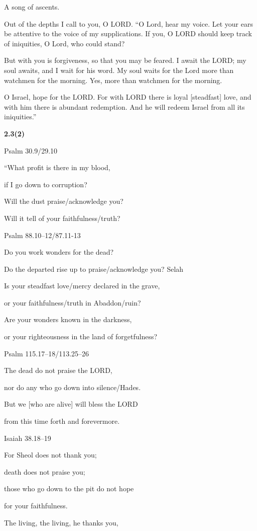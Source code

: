 \documentclass[
]{article}
\newcommand{\RL}[1]{\beginR #1\endR}
\begin{document}
A song of ascents.

Out of the depths I call to you, O LORD. \RL{``}O Lord, hear my voice.
Let your ears be attentive to the voice of my supplications. If you, O
LORD should keep track of iniquities, O Lord, who could stand?

But with you is forgiveness, so that you may be feared. I await the
LORD; my soul awaits, and I wait for his word. My soul waits for the
Lord more than watchmen for the morning. Yes, more than watchmen for the
morning.

O Israel, hope for the LORD. For with LORD there is loyal
{[}steadfast{]} love, and with him there is abundant redemption. And he
will redeem Israel from all its iniquities.''

\textbf{2.3(2)}

Psalm 30.9/29.10

\RL{``}What profit is there in my blood,

if I go down to corruption?

Will the dust praise/acknowledge you?

Will it tell of your faithfulness/truth?

Psalm 88.10--12/87.11-13

Do you work wonders for the dead?

Do the departed rise up to praise/acknowledge you? Selah

Is your steadfast love/mercy declared in the grave,

or your faithfulness/truth in Abaddon/ruin?

Are your wonders known in the darkness,

or your righteousness in the land of forgetfulness?

Psalm 115.17--18/113.25--26

The dead do not praise the LORD,

nor do any who go down into silence/Hades.

But we {[}who are alive{]} will bless the LORD

from this time forth and forevermore.

Isaiah 38.18--19

For Sheol does not thank you;

death does not praise you;

those who go down to the pit do not hope

for your faithfulness.

The living, the living, he thanks you,
\end{document}
